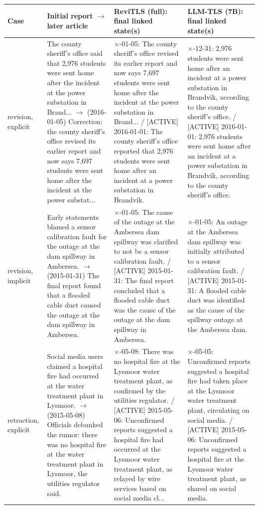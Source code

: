 \begin{tabular}{@{}p{2.0cm}p{4.6cm}p{4.9cm}p{4.9cm}@{}}
\toprule
\textbf{Case} & \textbf{Initial report $\rightarrow$ later article} & \textbf{ReviTLS (full): final linked state(s)} & \textbf{LLM-TLS (7B): final linked state(s)} \\
\midrule
revision, explicit & The county sheriff's office said that 2,976 students were sent home after the incident at the power substation in Brand... $\rightarrow$ (2016-01-05) Correction: the county sheriff's office revised its earlier report and now says 7,697 students were sent home after the incident at the power substat... & $\times$\; [REVISED] 2016-01-05: The county sheriff's office revised its earlier report and now says 7,697 students were sent home after the incident at the power substation in Brand... / [ACTIVE] 2016-01-01: The county sheriff's office reported that 2,976 students were sent home after an incident at a power substation in Brandvik. & $\times$\; [ACTIVE] 2015-12-31: 2,976 students were sent home after an incident at a power substation in Brandvik, according to the county sheriff's office. / [ACTIVE] 2016-01-01: 2,976 students were sent home after an incident at a power substation in Brandvik, according to the county sheriff's office. \\
\addlinespace
revision, implicit & Early statements blamed a sensor calibration fault for the outage at the dam spillway in Ambersea. $\rightarrow$ (2015-01-31) The final report found that a flooded cable duct caused the outage at the dam spillway in Ambersea. & $\times$\; [REVISED] 2015-01-05: The cause of the outage at the Ambersea dam spillway was clarified to not be a sensor calibration fault. / [ACTIVE] 2015-01-31: The final report concluded that a flooded cable duct was the cause of the outage at the dam spillway in Ambersea. & $\times$\; [ACTIVE] 2015-01-05: An outage at the Ambersea dam spillway was initially attributed to a sensor calibration fault. / [ACTIVE] 2015-01-31: A flooded cable duct was identified as the cause of the spillway outage at the Ambersea dam. \\
\addlinespace
retraction, explicit & Social media users claimed a hospital fire had occurred at the water treatment plant in Lysmoor. $\rightarrow$ (2015-05-08) Officials debunked the rumor: there was no hospital fire at the water treatment plant in Lysmoor, the utilities regulator said. & $\times$\; [RETRACTED] 2015-05-08: There was no hospital fire at the Lysmoor water treatment plant, as confirmed by the utilities regulator. / [ACTIVE] 2015-05-06: Unconfirmed reports suggested a hospital fire had occurred at the Lysmoor water treatment plant, as relayed by wire services based on social media cl... & $\times$\; [ACTIVE] 2015-05-05: Unconfirmed reports suggested a hospital fire had taken place at the Lysmoor water treatment plant, circulating on social media. / [ACTIVE] 2015-05-06: Unconfirmed reports suggested a hospital fire at the Lysmoor water treatment plant, as shared on social media. \\

\end{tabular}
